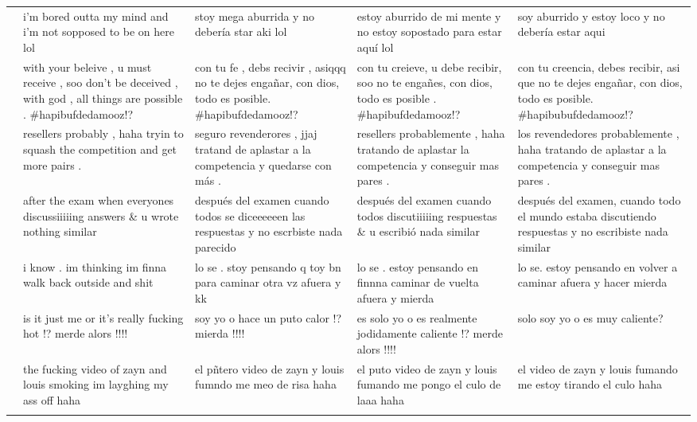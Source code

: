 \documentclass[11pt]{article}
\begin{document}
{\begin{longtable}{c p{3.3cm} p{3.3cm} p{3.3cm} p{3.3cm}}
  \addlinespace
  31 & i'm bored outta my mind and i'm not sopposed to be on here lol & stoy mega aburrida y no debería star aki lol & estoy aburrido de mi mente y no estoy sopostado para estar aquí lol & soy aburrido y estoy loco y no debería estar aqui \\
  \addlinespace
  32 & with your beleive , u must receive , soo don't be deceived , with god , all things are possible . \#hapibufdedamooz!? & con tu fe , debs recivir , asiqqq no te dejes engañar, con dios, todo es posible. \#hapibufdedamooz!? & con tu creieve, u debe recibir, soo no te engañes, con dios, todo es posible . \#hapibufdedamooz!? & con tu creencia, debes recibir, asi que no te dejes engañar, con dios, todo es posible. \#hapibubufdedamooz!? \\
  \addlinespace
  33 & resellers probably , haha tryin to squash the competition and get more pairs . & seguro revenderores , jjaj tratand de aplastar a la competencia y quedarse con más . & resellers probablemente , haha tratando de aplastar la competencia y conseguir mas pares . & los revendedores probablemente , haha tratando de aplastar a la competencia y conseguir mas pares . \\
  \addlinespace
  34 & after the exam when everyones discussiiiiing answers \& u wrote nothing similar & después del examen cuando todos se diceeeeeen las respuestas y no escrbiste nada parecido & después del examen cuando todos discutiiiiing respuestas \& u escribió nada similar & después del examen, cuando todo el mundo estaba discutiendo respuestas y no escribiste nada similar \\
  \addlinespace
  35 & i know . im thinking im finna walk back outside and shit & lo se . stoy pensando q toy bn para caminar otra vz afuera y kk & lo se . estoy pensando en finnna caminar de vuelta afuera y mierda & lo se. estoy pensando en volver a caminar afuera y hacer mierda \\
  \addlinespace
  36 & is it just me or it's really fucking hot !? merde alors !!!! & soy yo o hace un puto calor !? mierda !!!! & es solo yo o es realmente jodidamente caliente !? merde alors !!!! & solo soy yo o es muy caliente? \\
  \addlinespace
  37 & the fucking video of zayn and louis smoking im layghing my ass off haha & el pñtero video de zayn y louis fumndo me meo de risa haha & el puto video de zayn y louis fumando me pongo el culo de laaa haha & el video de zayn y louis fumando me estoy tirando el culo haha \\
  \addlinespace

\end{longtable}}
\end{document}
